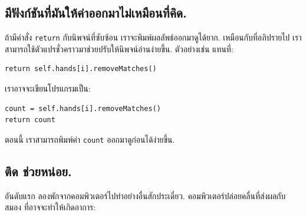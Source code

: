\subsection{มีฟังก์ชันที่มันให้ค่าออกมาไม่เหมือนที่คิด.}


ถ้ามีคำสั่ง \texttt{return} กับนิพจน์ที่ซับซ้อน
เราจะพิมพ์ผลลัพธ์ออกมาดูได้ยาก.
เหมือนกับที่อภิปรายไป
เราสามารถใช้ตัวแปรชั่วคราวมาช่วยปรับให้นิพจน์อ่านง่ายขึ้น.
ตัวอย่างเช่น
แทนที่:

\begin{verbatim}
return self.hands[i].removeMatches()
\end{verbatim}
%
%
เราอาจจะเขียนโปรแกรมเป็น:

\begin{verbatim}
count = self.hands[i].removeMatches()
return count
\end{verbatim}
%
%
ตอนนี้
เราสามารถพิมพ์ค่า \texttt{count} ออกมาดูก่อนได้ง่ายขึ้น.


\subsection{ติด ช่วยหน่อย.}


อันดับแรก
ลองพักจากคอมพิวเตอร์ไปทำอย่างอื่นสักประเดี๋ยว.
คอมพิวเตอร์ปล่อยคลื่นที่ส่งผลกับสมอง
ที่อาจจะทำให้เกิดอาการ:

